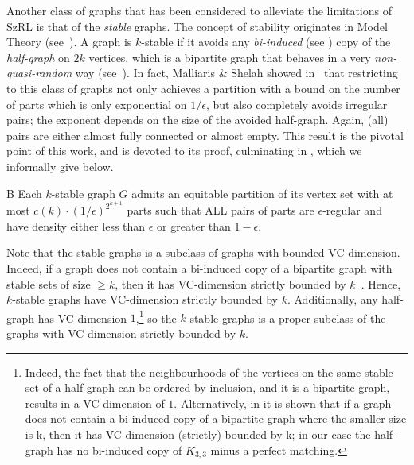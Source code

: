         Another class of graphs that has been considered to alleviate the limitations of SzRL is that of the \emph{stable}
        graphs.
        The concept of stability originates in Model Theory
        (see~\cite{classification_theory_and_the_number_of_non_isomorphic_models}).
        A graph is $k$-stable if it avoids any \emph{bi-induced} (see ) copy of the \emph{half-graph}
        on $2k$ vertices, which is a bipartite graph that behaves in a very \emph{non-quasi-random} way (see~).
        In fact, Malliaris \& Shelah showed in~\cite[Theorem 5.19]{regularity_lemmas_for_stable_graphs} that restricting
        to this class of graphs not only achieves a partition with a bound on the number of parts which is only exponential
        on $1/\epsilon$, but also completely avoids irregular pairs; the exponent depends on the size of the avoided half-graph.
        Again, (all) pairs are either almost fully connected or almost empty.
        This result is the pivotal point of this work, and  is devoted to its proof,
        culminating in , which we informally give below.

        \begin{thm*}{B} \label{thm:B}
            Each $k$-stable graph $G$ admits an equitable partition of its vertex set with at most
            ${c(k)\cdot(1/\epsilon)^{2^{k+1}}}$ parts such that ALL pairs of parts
            are $\epsilon$-regular and have density either less than $\epsilon$ or greater than $1 - \epsilon$.
        \end{thm*}

        Note that the stable graphs is a subclass of graphs with bounded VC-dimension.
        Indeed, if a graph does not contain a bi-induced copy of a bipartite graph with stable sets of size $\geq k$,
        then it has VC-dimension strictly bounded by $k$~\cite{regularity_partitions_and_the_topology_of_graphons}.
        Hence, $k$-stable graphs have VC-dimension strictly bounded by $k$.
        Additionally, any half-graph has VC-dimension $1$,\footnote{
            Indeed, the fact that the neighbourhoods of the vertices on the same stable set of a half-graph can be
            ordered by inclusion, and it is a bipartite graph, results in a VC-dimension of $1$.
            Alternatively, in \cite{regularity_partitions_and_the_topology_of_graphons} it is shown that if a graph does not
            contain a bi-induced copy of a bipartite graph where the smaller size is k, then it has VC-dimension (strictly)
            bounded by k; in our case the half-graph has no bi-induced copy of $K_{3,3}$ minus a perfect matching.}
        so the $k$-stable graphs is a proper subclass of the graphs with VC-dimension strictly bounded by $k$.

